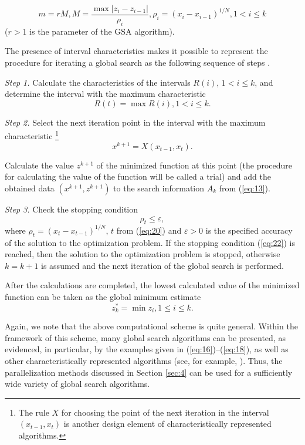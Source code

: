 \documentclass[review]{elsarticle}
\begin{document}
\begin{equation}\label{eq:19}
m=r M, M=\frac{\max|z_i-z_{i-1}|}{\rho_i}, \rho_i=(x_i-x_{i-1})^{1/N}  ,1 < i \leq k
\end{equation}
($r>1$ is the parameter of the GSA algorithm).

The presence of interval characteristics makes it possible to represent the procedure for iterating a global search as the following sequence of steps \cite{c5}.

\textit{Step 1.} Calculate the characteristics of the intervals $R(i)$, $1 < i \leq k$, and determine the interval with the maximum characteristic
\begin{equation}\label{eq:20}
R(t)=\max{R(i)}, 1 < i \leq k.
\end{equation}

\textit{Step 2.} Select the next iteration point in the interval with the maximum characteristic \footnote{The rule $X$ for choosing the point of the next iteration in the interval $(x_{t-1},x_t)$ is another design element of characteristically represented algorithms.}
\begin{equation}\label{eq:21}
x^{k+1}=X(x_{t-1},x_t ).
\end{equation}

Calculate the value $z^{k+1}$ of the minimized function at this point (the procedure for calculating the value of the function will be called a trial) and add the obtained data $(x^{k+1},z^{k+1})$ to the search information $A_k$ from (\ref{eq:13}).

\textit{Step 3.} Check the stopping condition 
\begin{equation}\label{eq:22}
\rho_t \leq \varepsilon,	
\end{equation}
where $\rho_t=(x_t-x_{t-1})^{1/N}$, $t$ from (\ref{eq:20}) and $\varepsilon > 0$ is the specified accuracy of the solution to the optimization problem. If the stopping condition (\ref{eq:22}) is reached, then the solution to the optimization problem is stopped, otherwise $k=k+1$ is assumed and the next iteration of the global search is performed. 

After the calculations are completed, the lowest calculated value of the minimized function can be taken as the global minimum estimate
\begin{equation}\label{eq:23}
z_k^*=\min{z_i}, 1 \leq i \leq k.
\end{equation}

Again, we note that the above computational scheme is quite general. Within the framework of this scheme, many global search algorithms can be presented, as evidenced, in particular, by the examples given in (\ref{eq:16})--(\ref{eq:18}), as well as other characteristically represented algorithms (see, for example, \cite{c22,c23,c24,c25,c26,c27,c28,c29,c30,c31}). Thus, the parallelization methods discussed in Section \ref{sec:4} can be used for a sufficiently wide variety of global search algorithms.
\end{document}
